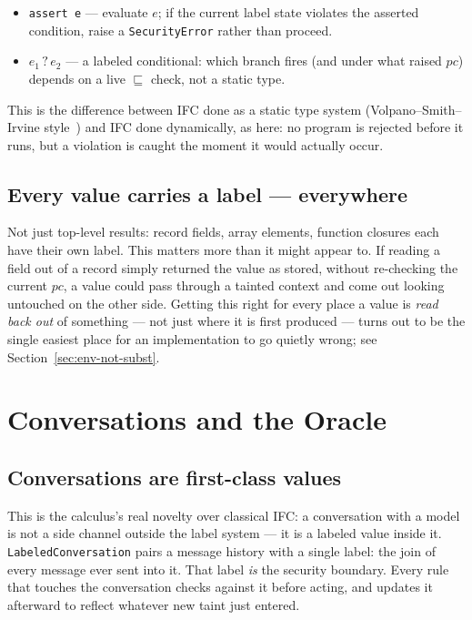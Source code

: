 \documentclass[11pt, a4paper]{article}
\newcommand{\flowsto}{\sqsubseteq}
\begin{document}
\begin{itemize}
  \item \lstinline{assert e} --- evaluate $e$; if the current label state
    violates the asserted condition, raise a \texttt{SecurityError} rather
    than proceed.
  \item $e_1 \mathbin{?} e_2$ --- a labeled conditional: which branch
    fires (and under what raised $pc$) depends on a live $\flowsto$ check,
    not a static type.
\end{itemize}

This is the difference between IFC done as a static type system
(Volpano--Smith--Irvine style~\cite{volpano1996}) and IFC done
dynamically, as here: no program is rejected before it runs, but a
violation is caught the moment it would actually occur.

\subsection{Every value carries a label --- everywhere}

Not just top-level results: record fields, array elements, function
closures each have their own label. This matters more than it might
appear to. If reading a field out of a record simply returned the value
as stored, without re-checking the current $pc$, a value could pass
through a tainted context and come out looking untouched on the other
side. Getting this right for every place a value is \emph{read back out}
of something --- not just where it is first produced --- turns out to be
the single easiest place for an implementation to go quietly wrong; see
Section~\ref{sec:env-not-subst}.

\section{Conversations and the Oracle}

\subsection{Conversations are first-class values}

This is the calculus's real novelty over classical IFC: a conversation
with a model is not a side channel outside the label system --- it is a
labeled value inside it. \texttt{LabeledConversation} pairs a message
history with a single label: the join of every message ever sent into it.
That label \emph{is} the security boundary. Every rule that touches the
conversation checks against it before acting, and updates it afterward to
reflect whatever new taint just entered.
\end{document}
